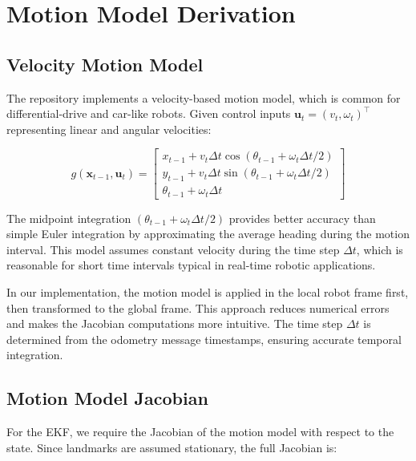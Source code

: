 \documentclass[12pt,a4paper]{article}
\newcommand{\state}{\bm{x}}
\newcommand{\control}{\bm{u}}
\begin{document}
\section{Motion Model Derivation}

\subsection{Velocity Motion Model}

The repository implements a velocity-based motion model, which is common for differential-drive and car-like robots. Given control inputs $\control_t = (v_t, \omega_t)^\top$ representing linear and angular velocities:

\begin{equation}
    g(\state_{t-1}, \control_t) = \begin{bmatrix}
        x_{t-1} + v_t \Delta t \cos(\theta_{t-1} + \omega_t \Delta t / 2) \\
        y_{t-1} + v_t \Delta t \sin(\theta_{t-1} + \omega_t \Delta t / 2) \\
        \theta_{t-1} + \omega_t \Delta t
    \end{bmatrix}
    \label{eq:motion_model}
\end{equation}

The midpoint integration $(\theta_{t-1} + \omega_t \Delta t / 2)$ provides better accuracy than simple Euler integration by approximating the average heading during the motion interval. This model assumes constant velocity during the time step $\Delta t$, which is reasonable for short time intervals typical in real-time robotic applications.

In our implementation, the motion model is applied in the local robot frame first, then transformed to the global frame. This approach reduces numerical errors and makes the Jacobian computations more intuitive. The time step $\Delta t$ is determined from the odometry message timestamps, ensuring accurate temporal integration.

\subsection{Motion Model Jacobian}

For the EKF, we require the Jacobian of the motion model with respect to the state. Since landmarks are assumed stationary, the full Jacobian is:
\end{document}
